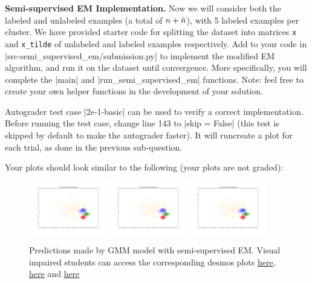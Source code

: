 \item {}
\textbf{Semi-supervised EM Implementation.}
Now we will consider both the labeled and unlabeled examples (a total of ${n} + \tilde{{n}}$), with 5 labeled examples per cluster. We have provided starter code for splitting the dataset into matrices \texttt{x} and \texttt{x\_tilde} of unlabeled and labeled examples respectively. Add to your code in |src-semi_supervised_em/submission.py| to implement the modified EM algorithm, and run it on the dataset until convergence.
More specifically, you will complete the |main| and |run_semi_supervised_em| functions. Note: feel free to create your own helper functions in the development of your solution.

Autograder test case |2e-1-basic| can be used to verify a correct implementation.  Before running the test case, change line 143 to |skip = False| (this test is skipped by default to make the autograder faster).  It will runcreate a plot for each trial, as done in the previous sub-question.

Your plots should look similar to the following (your plots are not graded):

  \begin{figure}[H]
    \centering
    \includegraphics[width=0.3\textwidth]{02-semi_supervised_em/pred_ss_0.pdf}
    \includegraphics[width=0.3\textwidth]{02-semi_supervised_em/pred_ss_1.pdf}
    \includegraphics[width=0.3\textwidth]{02-semi_supervised_em/pred_ss_2.pdf}
    \caption{Predictions made by GMM model with semi-supervised EM. Visual impaired students can access the corresponding desmos plots \href{https://www.desmos.com/calculator/fyu9j2vtbp}{here}, \href{https://www.desmos.com/calculator/yxtvpmgwbk}{here} and \href{https://www.desmos.com/calculator/nr7tybpdho}{here}}
  \end{figure}

